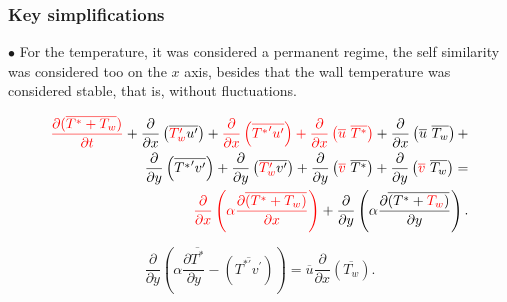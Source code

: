 \documentclass[xcolor=dvipsnames,8pt,aspectratio=34]{beamer}
\begin{document}
		\begin{frame}
		\frametitle{Key simplifications}
		$\bullet$ For the temperature, it was considered a permanent regime, the self similarity was considered too on the $x$ axis, besides that the wall temperature was considered stable, that is, without fluctuations.
	 	\begin{center}
	 	\begin{equation*}
	 		\begin{split}
	 		\color{red}\frac{\partial ( \overline{ T^\ast + T_w } ) }{\partial t} \color{black} +
	 		\frac{\partial{}}{\partial{x}} \left(\overline{ \color{red}T_w^{\prime} \color{black} u^{\prime}}\right) +
	 		\color{red}\frac{\partial{}}{\partial{x}} \left(\overline{{T^{\ast}}^{\prime} u^{\prime}}\right)+ \color{black}
	 		\color{red} \frac{\partial{}}{\partial{x}}\left(\overline{u} \ \overline{T^{\ast}}\right) \color{black}+ 
	 		\frac{\partial{}}{\partial{x}}\left(\overline{u} \ \overline{T_w}\right)+ 
	 		\\
	 		\frac{\partial{}}{\partial{y}} \left(\overline{{T^{\ast}}^{\prime} v^{\prime}}\right)+
	 		\frac{\partial{}}{\partial{y}} \left(\overline{\color{red}T_w^\prime \color{black} v^\prime}\right) + \frac{\partial{}}{\partial{y}}\left(\color{red}\overline{v} \color{black} \ \overline{T^\ast}\right) +
	 		\frac{\partial{}}{\partial{y}}\left(\color{red}\overline{v}\color{black} \ \overline{T_w}\right) 
	 		= 
	 		\\
	 		\color{red}{\frac{\partial{}}{\partial{x}}} \left(\alpha {\frac{\partial{\overline{(T^\ast + T_w)}}}{\partial{x}}} \right) \color{black}+
	 		{\frac{\partial{}}{\partial{y}}} \left(\alpha {\frac{\partial{\overline{(T^\ast + \color{red} T_w \color{black})}}}{\partial{y}}} \right) .
	 		\end{split}
	 	\end{equation*}
 		\end{center}
 		\begin{equation}\label{equation_var}
 			{\frac{\partial{}}{\partial{y}}} \left(\alpha {\frac{\partial{\overline{T^\ast}}}{\partial{y}}}   
 			- \left(\overline{ T^{\ast\prime} v^\prime}\right) \right)
 			= 
 			\overline{u}\frac{\partial{}}{\partial{x}}\left(\overline{T_w}\right)  .
 		\end{equation}
		\end{frame}
	
		
		
		
		
\end{document}
